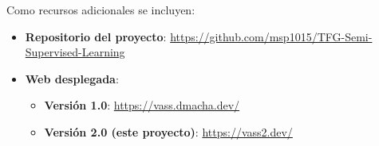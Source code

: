 Como recursos adicionales se incluyen:
\begin{itemize}
	\item \textbf{Repositorio del proyecto}: \url{https://github.com/msp1015/TFG-Semi-Supervised-Learning}
	\item \textbf{Web desplegada}: 
	\begin{itemize}
		\item \textbf{Versión 1.0}: \url{https://vass.dmacha.dev/}
		\item \textbf{Versión 2.0 (este proyecto)}: \url{https://vass2.dev/}
	\end{itemize}
\end{itemize}